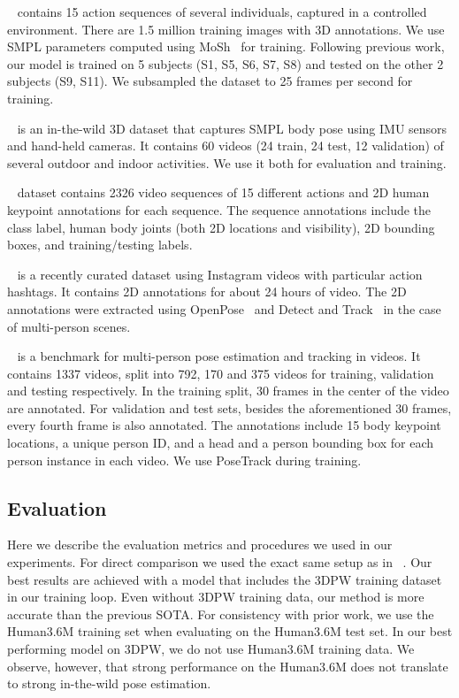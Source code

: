 \documentclass[10pt,twocolumn,letterpaper]{article}
\begin{document}
\vspace{0.1in}
~\cite{ionescu_h36m} contains 15 action sequences of several individuals, captured in a controlled environment. There are 1.5 million training images with 3D annotations. We use SMPL parameters computed using MoSh~\cite{Mosh} for training. Following  previous work, our model is trained on 5 subjects (S1, S5, S6, S7, S8) and tested on the other 2 subjects (S9, S11). We subsampled the dataset to 25 frames per second for training.

\vspace{0.1in}
~\cite{vonMarcard2018_3dpw} is an in-the-wild 3D dataset that captures SMPL body pose using IMU sensors and hand-held cameras. It contains 60 videos (24 train, 24 test,  12  validation) of several outdoor and indoor activities. We use it both for evaluation and training.


\vspace{0.1in}
~\cite{pennaction} dataset contains 2326 video sequences of 15 different actions and 2D human keypoint annotations for each sequence. The sequence annotations include the class label, human body joints (both 2D locations and visibility), 2D bounding boxes, and training/testing labels. 

\vspace{0.1in}
~\cite{kanazawa_temporal_hmr} is a recently curated dataset using Instagram videos with particular action hashtags. It contains 2D annotations for about 24 hours of video. The 2D annotations were extracted using OpenPose~\cite{cao2018openpose} and Detect and Track~\cite{girdhar2018detecttrack} in the case of multi-person scenes.

\vspace{0.1in}
~\cite{PoseTrack} is a benchmark for multi-person pose estimation and tracking in videos. It contains 1337 videos, split into 792, 170 and 375 videos for training, validation and testing respectively. In the training split, 30 frames in the center of the video are annotated. For validation and test sets, besides the aforementioned 30 frames, every fourth frame is also annotated. The annotations include 15 body keypoint locations, a unique person ID, and a head and a person bounding box for each person instance in each video. We use PoseTrack during training.

\subsection{Evaluation}
Here we describe the evaluation metrics and procedures we used in our experiments. 
For direct comparison we used the exact same setup as in ~\cite{SPIN:ICCV:2019}. Our best results are achieved with a model that includes the 3DPW training dataset in our training loop. Even without 3DPW training data, our method is more accurate than the previous SOTA.
For consistency with prior work, we use the Human3.6M training set when evaluating on the Human3.6M test set. 
In our best performing model on 3DPW, we do not use Human3.6M training data.
We observe, however, that strong performance on the Human3.6M does not translate to strong in-the-wild pose estimation.
\end{document}

